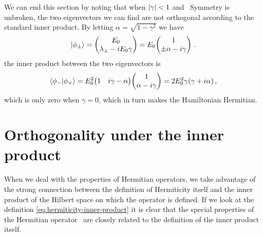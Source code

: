         We can end this section by noting that when $\abs{\gamma} < 1$ and \PT\ Symmetry is unbroken, the two eigenvectors we can find are not orthogonal according to the standard inner product. By letting $\alpha = \sqrt{1 - \gamma^2}$ we have 
        \begin{equation*}
            \ket{\phi_\pm}
            = \pmqty{E_0 \\ \lambda_\pm - i E_0 \gamma}
            = E_0 \!\pmqty{1 \\ \pm \alpha - i \gamma}
            \myperiod
        \end{equation*}
        the inner product between the two eigenvectors is
        \begin{equation}
            \label{eq:ex:non-orthogonality}
            \bra{\phi_-}\ket{\phi_+}
            = E_0^2\! \pmqty{1 & i \gamma - \alpha}\!\pmqty{1 \\ \alpha -i \gamma}
            = 2 E_0^2 \gamma \pqty{\gamma + i \alpha}
            \mycomma
        \end{equation}
        which is only zero when $\gamma = 0$, which in turn makes the Hamiltonian Hermitian.

    \section{Orthogonality under the \texorpdfstring{\PT}{PT} inner product}\label{s:orthogonality}
        When we deal with the properties of Hermitian operators, we take advantage of the strong connection between the definition of Hermiticity itself and the inner product of the Hilbert space on which the operator is defined. If we look at the definition \eqref{eq:hermiticity-inner-product} it is clear that the special properties of the Hermitian operator \hA\ are closely related to the definition of the inner product itself.
        

